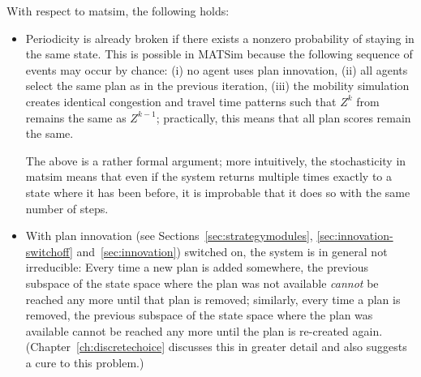 With respect to \gls{matsim}, the following holds: 
\begin{itemize}

\item Periodicity is already broken if there exists a nonzero probability of staying in
the same state. This is possible in MATSim 
because the following sequence of events may occur by chance:
(i) no agent uses plan innovation,
(ii) all agents select the same plan as in the previous iteration, 
(iii) the mobility simulation creates identical congestion and travel time patterns 
such that $Z^k$ from  remains the same as $Z^{k-1}$; practically, this means that all plan scores remain the same.   

The above is a rather formal argument; more intuitively, the stochasticity in \gls{matsim} means that even if the system returns multiple times exactly to a state where it has been before, it is improbable that it does so with the same number of steps. 



\item With plan innovation (see Sections~\ref{sec:strategymodules}, \ref{sec:innovation-switchoff} and~\ref{sec:innovation}) switched on, the system is in general not irreducible:
Every time a new plan is added somewhere, the previous subspace of the state space where the plan was not available \emph{cannot} be reached any more until that plan is removed; similarly, every time a plan is removed, the previous subspace of the state space where the plan was available cannot be reached any more until the plan is re-created again. (Chapter~\ref{ch:discretechoice} discusses this in greater detail and also suggests a cure to this problem.)


\end{itemize}
